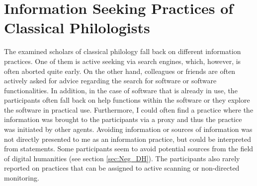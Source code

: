 \documentclass[12pt, a4paper, titlepage, oneside, abstract=true, toc=listof, toc=bibliography, BCOR=1cm]{scrreprt}
\begin{document}
{\section{Information Seeking Practices of Classical Philologists}
\label{sec:Disc_ISP}
The examined scholars of classical philology fall back on different information practices. One of them is active seeking via search engines, which, however, is often aborted quite early. On the other hand, colleagues or friends are often actively asked for advice regarding the search for software or software functionalities. In addition, in the case of software that is already in use, the participants often fall back on help functions within the software or they explore the software in practical use. Furthermore, I could often find a practice where the information was brought to the participants via a proxy and thus the practice was initiated by other agents. Avoiding information or sources of information was not directly presented to me as an information practice, but could be interpreted from statements. Some participants seem to avoid potential sources from the field of digital humanities (see section \ref{sec:Neg_DH}). The participants also rarely reported on practices that can be assigned to active scanning or non-directed monitoring.

}
\end{document}
